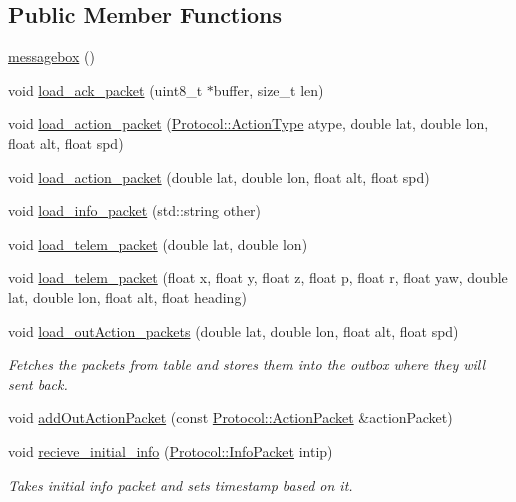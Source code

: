 \subsection*{Public Member Functions}
\begin{DoxyCompactItemize}
\item 
\hyperlink{classmessagebox_aa1982e07048de340df52d2a5f37dd8ac}{messagebox} ()
\item 
void \hyperlink{classmessagebox_ad5e6c9a2d407ebc95415e6ddeb91aba3}{load\+\_\+ack\+\_\+packet} (uint8\+\_\+t $\ast$buffer, size\+\_\+t len)
\item 
void \hyperlink{classmessagebox_afa0a64c35c27e21fab6cbee8055341b1}{load\+\_\+action\+\_\+packet} (\hyperlink{namespace_protocol_a95f2e35dc2d8d920f0d7ddaaf122c3b9}{Protocol\+::\+Action\+Type} atype, double lat, double lon, float alt, float spd)
\item 
void \hyperlink{classmessagebox_af79061031d97b9e3e0e677fe365b2b15}{load\+\_\+action\+\_\+packet} (double lat, double lon, float alt, float spd)
\item 
void \hyperlink{classmessagebox_a6128a1a53fbba888dccfcab5a5fafa1f}{load\+\_\+info\+\_\+packet} (std\+::string other)
\item 
void \hyperlink{classmessagebox_a0e3beabe499e7aade0e769ff17ced30d}{load\+\_\+telem\+\_\+packet} (double lat, double lon)
\item 
void \hyperlink{classmessagebox_acfa11fc9bcf7c96ddf2478b981be826d}{load\+\_\+telem\+\_\+packet} (float x, float y, float z, float p, float r, float yaw, double lat, double lon, float alt, float heading)
\item 
void \hyperlink{classmessagebox_a545d9441dccf14adbea8e859628d6425}{load\+\_\+out\+Action\+\_\+packets} (double lat, double lon, float alt, float spd)
\begin{DoxyCompactList}\small\item\em Fetches the packets from table and stores them into the outbox where they will sent back. \end{DoxyCompactList}\item 
void \hyperlink{classmessagebox_ad8dd259b5b34d30b241f27172a255575}{add\+Out\+Action\+Packet} (const \hyperlink{class_protocol_1_1_action_packet}{Protocol\+::\+Action\+Packet} \&action\+Packet)
\item 
void \hyperlink{classmessagebox_ac2463eee5d4c1e5d693f8a96cca0e00f}{recieve\+\_\+initial\+\_\+info} (\hyperlink{class_protocol_1_1_info_packet}{Protocol\+::\+Info\+Packet} intip)
\begin{DoxyCompactList}\small\item\em Takes initial info packet and sets timestamp based on it. \end{DoxyCompactList}\item 

\end{DoxyCompactItemize}
